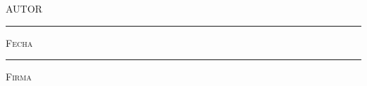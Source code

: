 \documentclass[11pt]{book}
\begin{document}

\thispagestyle{empty}
\vspace*{\fill}
\begingroup

\centering

\hspace{3em}

\textsc{AUTOR}

\vspace{5em}

\rule[1em]{20em}{0.5pt} %

\textsc{Fecha}
 
\vspace{8em}

\rule[1em]{20em}{0.5pt} %

\textsc{Firma}

\endgroup
\vspace*{\fill}



\pagestyle{empty}
\frontmatter







\end{document}
